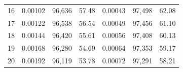 \begin{tabular}{cccc|ccc}
16   & 0.00102                                                          & 96,636                                                                                            & 57.48                                                                                                                      & 0.00043                                                          & 97,498                                                                                            & 62.08                                                                                                                      \\
17   & 0.00122                                                          & 96,538                                                                                            & 56.54                                                                                                                      & 0.00049                                                          & 97,456                                                                                            & 61.10                                                                                                                      \\
18   & 0.00144                                                          & 96,420                                                                                            & 55.61                                                                                                                      & 0.00056                                                          & 97,408                                                                                            & 60.13                                                                                                                      \\
19   & 0.00168                                                          & 96,280                                                                                            & 54.69                                                                                                                      & 0.00064                                                          & 97,353                                                                                            & 59.17                                                                                                                      \\
20   & 0.00192                                                          & 96,119                                                                                            & 53.78                                                                                                                      & 0.00072                                                          & 97,291                                                                                            & 58.21                                                                                                                      \\

\end{tabular}

